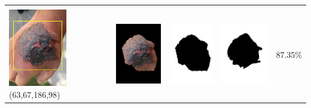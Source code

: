 \begin{table}[H]
\begin{tabular}{|m{1.0in}|m{1.0in}|m{1.0in}|m{1.0in}|m{0.6in}|}
		&  &  & \\
		\includegraphics[width=1.0in]{gambar/hasil_segmentasi/luka_hitam/image_31_rect.jpg} {\centering\fontsize{10}{10}\selectfont(63,67,186,98)}&
		\includegraphics[width=1.0in]{gambar/hasil_segmentasi/luka_hitam/result_31.jpg}&
		\includegraphics[width=1.0in]{gambar/hasil_segmentasi/luka_hitam/mask_r_31.jpg}&
		\includegraphics[width=1.0in]{gambar/hasil_segmentasi/luka_hitam/31_r.jpg}&
		87.35\% \\
		\hline 


\end{tabular}
\end{table}
